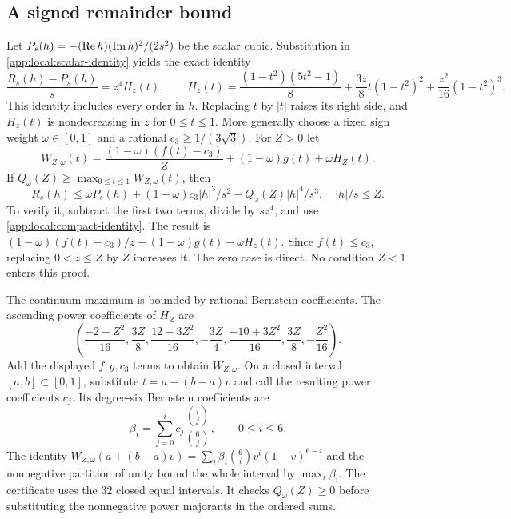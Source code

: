\subsection{A signed remainder bound}
\label{app:local:signed}

Let $P_s(h)=-(\operatorname{Re} h)(\operatorname{Im} h)^2/(2s^2)$ be the scalar cubic.
Substitution in \eqref{app:local:scalar-identity} yields the exact identity
\begin{equation}\label{app:local:compact-identity}
 \frac{R_s(h)-P_s(h)}s=z^4H_z(t),\qquad
 H_z(t)=\frac{(1-t^2)(5t^2-1)}8
       +\frac{3z}{8}t(1-t^2)^2+\frac{z^2}{16}(1-t^2)^3 .
\end{equation}
This identity includes every order in $h$. Replacing $t$ by $|t|$
raises its right side, and $H_z(t)$ is nondecreasing in $z$ for
$0\le t\le1$. More generally choose a fixed sign weight
$\omega\in[0,1]$ and a rational $c_3\ge1/(3\sqrt3)$. For $Z>0$ let
\[
 W_{Z,\omega}(t)=
 \frac{(1-\omega)(f(t)-c_3)}Z+(1-\omega)g(t)+\omega H_Z(t).
\]
If $Q_\omega(Z)\ge\max_{0\le t\le1}W_{Z,\omega}(t)$, then
\begin{equation}\label{app:local:fractional-scalar}
 R_s(h)\le\omega P_s(h)+(1-\omega)c_3|h|^3/s^2
                       +Q_\omega(Z)|h|^4/s^3,\quad |h|/s\le Z.
\end{equation}
To verify it, subtract the first two terms, divide by $sz^4$, and use
\eqref{app:local:compact-identity}. The result is
$(1-\omega)(f(t)-c_3)/z+(1-\omega)g(t)+\omega H_z(t)$.
Since $f(t)\le c_3$, replacing $0<z\le Z$ by $Z$ increases it.
The zero case is direct. No condition $Z<1$ enters this proof.

The continuum maximum is bounded by rational Bernstein coefficients.
The ascending power coefficients of $H_Z$ are
\[
 \left(\frac{-2+Z^2}{16},\frac{3Z}{8},
 \frac{12-3Z^2}{16},-\frac{3Z}{4},
 \frac{-10+3Z^2}{16},\frac{3Z}{8},-\frac{Z^2}{16}\right).
\]
Add the displayed $f,g,c_3$ terms to obtain $W_{Z,\omega}$.
On a closed interval $[a,b]\subset[0,1]$, substitute
$t=a+(b-a)v$ and call the resulting power coefficients $c_j$.
Its degree-six Bernstein coefficients are
\[
 \beta_i=\sum_{j=0}^i c_j\frac{\binom ij}{\binom6j},\qquad 0\le i\le6.
\]
The identity
$W_{Z,\omega}(a+(b-a)v)=\sum_i\beta_i\binom6iv^i(1-v)^{6-i}$
and the nonnegative partition of unity bound the whole interval by
$\max_i\beta_i$. The certificate uses the $32$ closed equal intervals.
It checks $Q_\omega(Z)\ge0$ before substituting the nonnegative power
majorants in the ordered sums.

